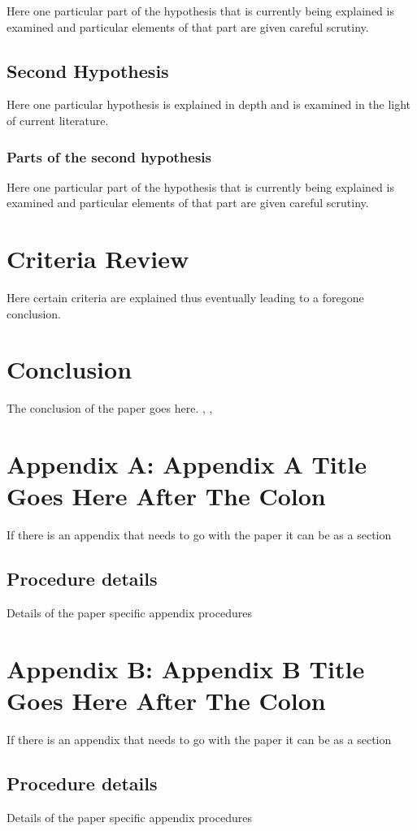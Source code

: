 \documentclass[
]{article}
\begin{document}
Here one particular part of the hypothesis that is currently being
explained is examined and particular elements of that part are given
careful scrutiny.

\subsection{Second Hypothesis}

Here one particular hypothesis is explained in depth and is examined in
the light of current literature.

\subsubsection{Parts of the second hypothesis}

Here one particular part of the hypothesis that is currently being
explained is examined and particular elements of that part are given
careful scrutiny.

\section{Criteria Review}

Here certain criteria are explained thus eventually leading to a
foregone conclusion.

\section{Conclusion}\label{conclusion}

The conclusion of the paper goes here. \cite{cox} \cite{Ancey1996},
\cite{RR73} \cite{Aup91}, \cite{Dou72}




\section{Appendix A: Appendix A Title Goes Here After The Colon}

If there is an appendix that needs to go with the paper it can be as a
section \cite{Aup91}

\subsection{Procedure details}

Details of the paper specific appendix procedures

\section{Appendix B: Appendix B Title Goes Here After The Colon}

If there is an appendix that needs to go with the paper it can be as a
section \cite{Aup91}

\subsection{Procedure details}

Details of the paper specific appendix procedures
\end{document}
